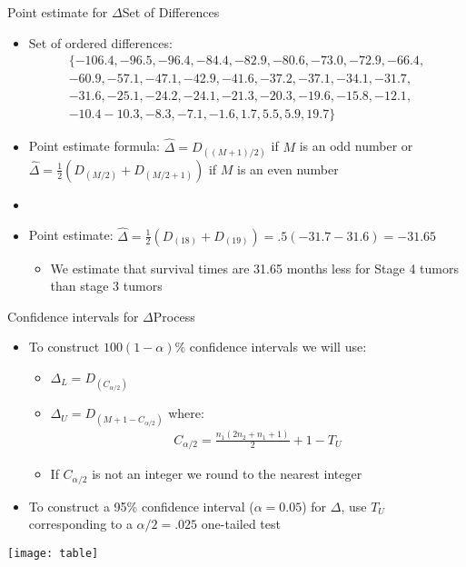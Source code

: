 \documentclass[xcolor=dvipsnames]{beamer}
\begin{document}
\begin{frame}{Point estimate for $\Delta$}{Set of Differences}
	\begin{itemize}
		\item Set of ordered differences: \pause
		\begin{gather*}
			\{-106.4,  -96.5,  -96.4,  -84.4,  -82.9,  -80.6,  -73.0,  -72.9,  -66.4,\\ -60.9,  -57.1,  -47.1,  -42.9, -41.6,  -37.2,  -37.1,  -34.1, 
			-31.7, \\ -31.6,  -25.1,  -24.2,  -24.1,  -21.3,  -20.3,  -19.6,  -15.8,  -12.1, \\ -10.4   -10.3,   -8.3,   -7.1,   -1.6,    1.7,    5.5, 5.9,   19.7\}
		\end{gather*} \pause
		\item Point estimate formula: $\hat{\Delta} = D_{((M+1)/2)}$ if $M$ is an odd number or $\hat{\Delta} = \frac{1}{2} (D_{(M/2)} + D_{(M/2+1)})$ if $M$ is an even number \pause
		\item[]
		\item Point estimate: $\hat{\Delta} = \frac{1}{2} (D_{(18)} + D_{(19)}) = .5(-31.7 - 31.6) = -31.65$
		\begin{itemize}
			\item We estimate that survival times are 31.65 months less for Stage 4 tumors than stage 3 tumors
		\end{itemize}
	\end{itemize}
\end{frame}

\begin{frame}{Confidence intervals for $\Delta$}{Process}
\begin{itemize}
	\item To construct $100(1-\alpha) \%$ confidence intervals we will use: \pause
	\begin{itemize}
		\item $\Delta_L = D_{(C_{\alpha / 2})}$ \pause
		\item $\Delta_U = D_{(M + 1 - C_{\alpha / 2})}$ \pause
		where:
		\begin{gather*}
		C_{\alpha / 2} = \frac{n_1 (2n_2 + n_1 + 1)}{2} + 1 - T_U
		\end{gather*}
				\item If $C_{\alpha / 2}$ is not an integer we round to the nearest integer \pause
	\end{itemize}
	\item To construct a 95\% confidence interval ($\alpha = 0.05$) for $\Delta$, use $T_U$ corresponding to a $\alpha /2 = .025$ one-tailed test
\end{itemize}
\begin{center}
	\texttt{[image: table]}
\end{center}
\end{frame}
\end{document}
